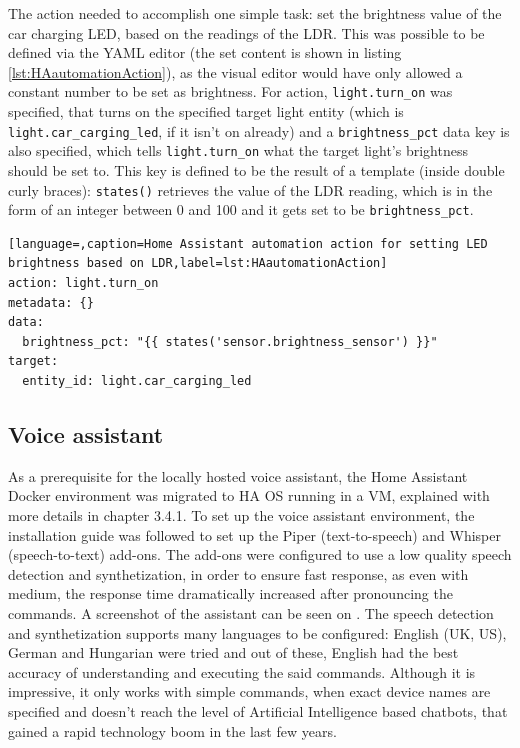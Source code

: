 The action needed to accomplish one simple task: set the brightness value of the car charging LED, based on the readings of the LDR. This was possible to be defined via the YAML editor (the set content is shown in listing \ref{lst:HAautomationAction}), as the visual editor would have only allowed a constant number to be set as brightness. For action, \verb+light.turn_on+ was specified, that turns on the specified target light entity (which is \verb+light.car_carging_led+, if it isn't on already) and a \verb+brightness_pct+ data key is also specified, which tells \verb+light.turn_on+ what the target light's brightness should be set to. This key is defined to be the result of a template (inside double curly braces): \verb+states()+ retrieves the value of the LDR reading, which is in the form of an integer between 0 and 100 and it gets set to be \verb+brightness_pct+.

\begin{lstlisting}[language=,caption=Home Assistant automation action for setting LED brightness based on LDR,label=lst:HAautomationAction]
action: light.turn_on
metadata: {}
data:
  brightness_pct: "{{ states('sensor.brightness_sensor') }}"
target:
  entity_id: light.car_carging_led  
\end{lstlisting}
\break

\subsection{Voice assistant}

As a prerequisite for the locally hosted voice assistant, the Home Assistant Docker environment was migrated to HA OS running in a VM, explained with more details in chapter 3.4.1. To set up the voice assistant environment, the installation guide was followed to set up the Piper (text-to-speech) and Whisper (speech-to-text) add-ons. \cite{HALocalAssist} The add-ons were configured to use a low quality speech detection and synthetization, in order to ensure fast response, as even with medium, the response time dramatically increased after pronouncing the commands. A screenshot of the assistant can be seen on . The speech detection and synthetization supports many languages to be configured: English (UK, US), German and Hungarian were tried and out of these, English had the best accuracy of understanding and executing the said commands. Although it is impressive, it only works with simple commands, when exact device names are specified and doesn't reach the level of Artificial Intelligence based chatbots, that gained a rapid technology boom in the last few years.

